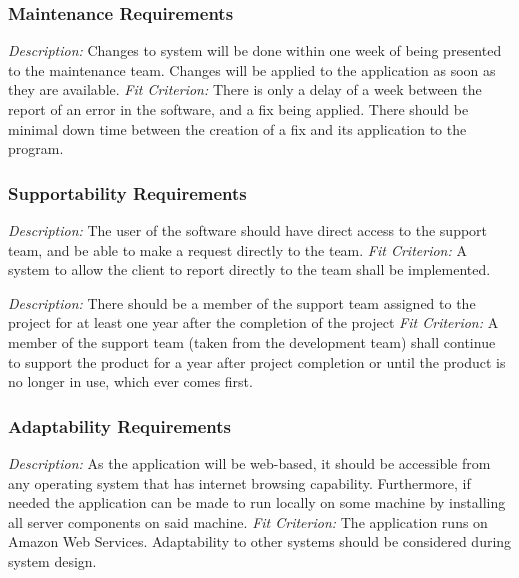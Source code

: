 \documentclass[12pt, titlepage]{article}
\begin{document}
\subsubsection{Maintenance Requirements}
\textit{Description:}\newline
Changes to system will be done within one week of being presented to the maintenance team. Changes will be applied to the application as soon as they are available.
\newline \newline 
\textit{Fit Criterion:}\newline 
There is only a delay of a week between the report of an error in the software, and a fix being applied. There should be minimal down time between the creation of a fix and its application to the program.

\subsubsection{Supportability Requirements}
\textit{Description:}\newline
The user of the software should have direct access to the support team, and be able to make a request directly to the team.
\newline \newline 
\textit{Fit Criterion:}\newline 
A system to allow the client to report directly to the team shall be implemented.

\textit{Description:}\newline
There should be a member of the support team assigned to the project for at least one year after the completion of the project
\newline \newline 
\textit{Fit Criterion:}\newline 
A member of the support team (taken from the development team) shall continue to support the product for a year after project completion or until the product is no longer in use, which ever comes first.

\subsubsection{Adaptability Requirements}
\textit{Description:}\newline
As the application will be web-based, it should be accessible from any operating system that has internet browsing capability. Furthermore, if needed the application can be made to run locally on some machine by installing all server components on said machine.
\newline \newline 
\textit{Fit Criterion:}\newline 
The application runs on Amazon Web Services. Adaptability to other systems should be considered during system design.
\end{document}

